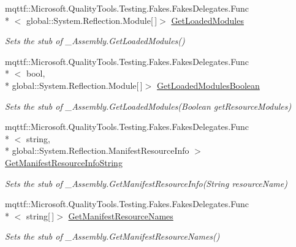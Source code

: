 \begin{DoxyCompactItemize}
mqttf\-::\-Microsoft.\-Quality\-Tools.\-Testing.\-Fakes.\-Fakes\-Delegates.\-Func\\*
$<$ global\-::\-System.\-Reflection.\-Module\mbox{[}$\,$\mbox{]}$>$ \hyperlink{class_system_1_1_runtime_1_1_interop_services_1_1_fakes_1_1_stub___assembly_a07bbde9faa0694fd32505bacb4f18b49}{Get\-Loaded\-Modules}
\begin{DoxyCompactList}\small\item\em Sets the stub of \-\_\-\-Assembly.\-Get\-Loaded\-Modules()\end{DoxyCompactList}\item 
mqttf\-::\-Microsoft.\-Quality\-Tools.\-Testing.\-Fakes.\-Fakes\-Delegates.\-Func\\*
$<$ bool, \\*
global\-::\-System.\-Reflection.\-Module\mbox{[}$\,$\mbox{]}$>$ \hyperlink{class_system_1_1_runtime_1_1_interop_services_1_1_fakes_1_1_stub___assembly_ab75303bbab5ef71b18e8605ff0331896}{Get\-Loaded\-Modules\-Boolean}
\begin{DoxyCompactList}\small\item\em Sets the stub of \-\_\-\-Assembly.\-Get\-Loaded\-Modules(\-Boolean get\-Resource\-Modules)\end{DoxyCompactList}\item 
mqttf\-::\-Microsoft.\-Quality\-Tools.\-Testing.\-Fakes.\-Fakes\-Delegates.\-Func\\*
$<$ string, \\*
global\-::\-System.\-Reflection.\-Manifest\-Resource\-Info $>$ \hyperlink{class_system_1_1_runtime_1_1_interop_services_1_1_fakes_1_1_stub___assembly_a1b7f72a0ffd28ea891c95df8765fbcad}{Get\-Manifest\-Resource\-Info\-String}
\begin{DoxyCompactList}\small\item\em Sets the stub of \-\_\-\-Assembly.\-Get\-Manifest\-Resource\-Info(\-String resource\-Name)\end{DoxyCompactList}\item 
mqttf\-::\-Microsoft.\-Quality\-Tools.\-Testing.\-Fakes.\-Fakes\-Delegates.\-Func\\*
$<$ string\mbox{[}$\,$\mbox{]}$>$ \hyperlink{class_system_1_1_runtime_1_1_interop_services_1_1_fakes_1_1_stub___assembly_aee027cba18fedb7d65b4028bc00de59e}{Get\-Manifest\-Resource\-Names}
\begin{DoxyCompactList}\small\item\em Sets the stub of \-\_\-\-Assembly.\-Get\-Manifest\-Resource\-Names()\end{DoxyCompactList}\item 

\end{DoxyCompactItemize}
